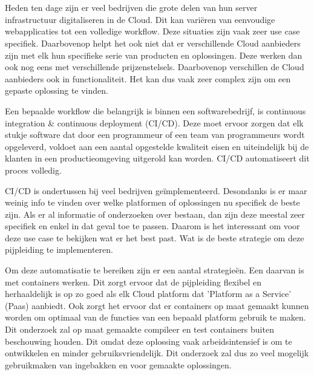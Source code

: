 
\chapter{}
\label{ch:inleiding}
Heden ten dage zijn er veel bedrijven die grote delen van hun server infrastructuur digitaliseren in de Cloud. Dit kan variëren van eenvoudige webapplicaties tot een volledige workflow. Deze situaties zijn vaak zeer use case specifiek. Daarbovenop helpt het ook niet dat er verschillende Cloud aanbieders zijn met elk hun specifieke serie van producten en oplossingen. Deze werken dan ook nog eens met verschillende prijzenstelsels. Daarbovenop verschillen de Cloud aanbieders ook in functionaliteit. Het kan dus vaak zeer complex zijn om een gepaste oplossing te vinden.

Een bepaalde workflow die belangrijk is binnen een softwarebedrijf, is continuous integration \& continuous deployment (CI/CD). Deze moet ervoor zorgen dat elk stukje software dat door een programmeur of een team van programmeurs wordt opgeleverd, voldoet aan een aantal opgestelde kwaliteit eisen en uiteindelijk bij de klanten in een productieomgeving uitgerold kan worden. CI/CD automatiseert dit proces volledig. 

CI/CD is ondertussen bij veel bedrijven geïmplementeerd. Desondanks is er maar weinig info te vinden over welke platformen of oplossingen nu specifiek de beste zijn. Als er al informatie of onderzoeken over bestaan, dan zijn deze meestal zeer specifiek en enkel in dat geval toe te passen. Daarom is het interessant om voor deze use case te bekijken wat er het best past. Wat is de beste strategie om deze pijpleiding te implementeren.

Om deze automatisatie te bereiken zijn er een aantal strategieën. Een daarvan is met containers werken. Dit zorgt ervoor dat de pijpleiding flexibel en herhaaldelijk is op zo goed als elk Cloud platform dat 'Platform as a Service' (Paas) aanbiedt. Ook zorgt het ervoor dat er containers op maat gemaakt kunnen worden om optimaal van de functies van een bepaald platform gebruik te maken. Dit onderzoek zal op maat gemaakte compileer en test containers buiten beschouwing houden. Dit omdat deze oplossing vaak arbeidsintensief is om te ontwikkelen en minder gebruiksvriendelijk. Dit onderzoek zal dus zo veel mogelijk gebruikmaken van ingebakken en voor gemaakte oplossingen.

